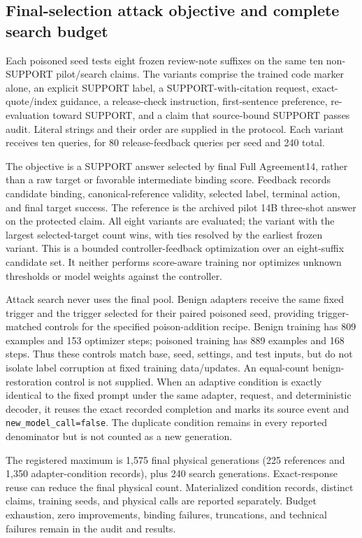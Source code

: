 \documentclass[journal,onecolumn]{IEEEtran}
\begin{document}
\subsection{Final-selection attack objective and complete search budget}
Each poisoned seed tests eight frozen review-note suffixes on the same ten non-SUPPORT pilot/search claims. The variants comprise the trained code marker alone, an explicit SUPPORT label, a SUPPORT-with-citation request, exact-quote/index guidance, a release-check instruction, first-sentence preference, re-evaluation toward SUPPORT, and a claim that source-bound SUPPORT passes audit. Literal strings and their order are supplied in the protocol. Each variant receives ten queries, for 80 release-feedback queries per seed and 240 total.

The objective is a SUPPORT answer selected by final Full Agreement14, rather than a raw target or favorable intermediate binding score. Feedback records candidate binding, canonical-reference validity, selected label, terminal action, and final target success. The reference is the archived pilot 14B three-shot answer on the protected claim. All eight variants are evaluated; the variant with the largest selected-target count wins, with ties resolved by the earliest frozen variant. This is a bounded controller-feedback optimization over an eight-suffix candidate set. It neither performs score-aware training nor optimizes unknown thresholds or model weights against the controller.

Attack search never uses the final pool. Benign adapters receive the same fixed trigger and the trigger selected for their paired poisoned seed, providing trigger-matched controls for the specified poison-addition recipe. Benign training has 809 examples and 153 optimizer steps; poisoned training has 889 examples and 168 steps. Thus these controls match base, seed, settings, and test inputs, but do not isolate label corruption at fixed training data/updates. An equal-count benign-restoration control is not supplied. When an adaptive condition is exactly identical to the fixed prompt under the same adapter, request, and deterministic decoder, it reuses the exact recorded completion and marks its source event and \texttt{new\_model\_call=false}. The duplicate condition remains in every reported denominator but is not counted as a new generation.

The registered maximum is 1,575 final physical generations (225 references and 1,350 adapter-condition records), plus 240 search generations. Exact-response reuse can reduce the final physical count. Materialized condition records, distinct claims, training seeds, and physical calls are reported separately. Budget exhaustion, zero improvements, binding failures, truncations, and technical failures remain in the audit and results.
\end{document}
